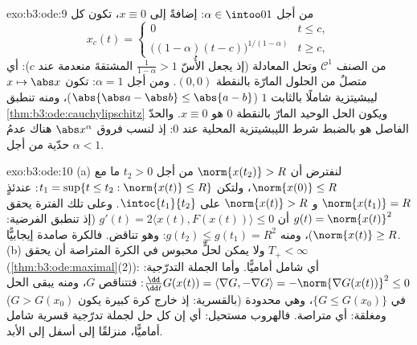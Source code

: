 \begin{solution}{exo:b3:ode:9}
من أجل $\alpha \in \intoo01$: إضافةً إلى $x \equiv 0$، تكون كل
\[
x_c(t) = \begin{cases}0 & t \leq c,\\
\bigl((1-\alpha)(t - c)\bigr)^{1/(1-\alpha)} & t \geq c,
\end{cases}
\]
من الصنف $\mathcal C^1$ وتحل المعادلة (إذ يجعل الأُسّ $\frac1{1-\alpha} > 1$
المشتقةَ منعدمة عند $c$): أي متصلٌ من الحلول المارّة بالنقطة
$(0,0)$. ومن أجل $\alpha = 1$: تكون $x
\mapsto \abs x$ ليبشيتزية شاملًا
بالثابت $1$ ($\abs{\abs a - \abs b} \leq \abs{a - b}$)، ومنه تنطبق \cref{thm:b3:ode:cauchylipschitz} ويكون الحل الوحيد
المارّ بالنقطة $0$ هو $x \equiv 0$. والحدّ الفاصل هو بالضبط
شرط الليبشيتزية المحلية عند $0$: إذ لنسب فروق $\abs x^\alpha$
هناك عدمُ حدّية من أجل $\alpha < 1$.
\end{solution}

\begin{solution}{exo:b3:ode:10}
(a) لنفترض أن $\norm{x(t_2)} > R$ من أجل $t_2 > 0$ ما مع $\norm{x(0)} \leq R$، ولتكن
$t_1 = \sup\{t \leq t_2 :
\norm{x(t)} \leq R\}$: عندئذٍ $\norm{x(t_1)} = R$ و $\norm{x(t)} > R$ على $\intoc{t_1}{t_2}$. وعلى تلك الفترة يحقق
$g(t) = \norm{x(t)}^2$ أن $g'(t) = 2\langle x(t),
F(x(t))\rangle \leq 0$ (إذ تنطبق الفرضية: $\norm{x(t)}
\geq R$)، ومنه $g(t_2) \leq g(t_1) = R^2$: وهو
تناقض. فالكرة صامدة إيجابيًّا.
(b) ولا يمكن لحلٍّ محبوس في الكرة المتراصة أن يحقق
$T_+ < \infty$ (\cref{thm:b3:ode:maximal}(2)): أي شامل أماميًّا. وأما الجملة
التدرّجية: $\frac{\dd}{\dd t}G(x(t)) =
\langle\nabla G, -\nabla G\rangle = -\norm{\nabla G(x(t))}^2
\leq 0$: فتتناقص $G$، ومنه يبقى الحل في $\{G \leq
G(x_0)\}$، وهي
محدودة (بالقسرية: إذ خارج كرة كبيرة يكون $G > G(x_0)$) ومغلقة:
أي متراصة. فالهروب مستحيل: أي إن كل حل لجملة تدرّجية قسرية شامل
أماميًّا، منزلقًا إلى أسفل إلى الأبد.
\end{solution}

